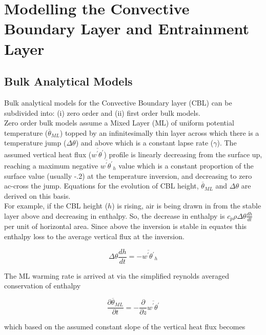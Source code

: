 \section{Modelling the Convective Boundary Layer and Entrainment Layer}
\label{sec:}

\subsection{Bulk Analytical Models}
\label{subsec:}
Bulk analytical models for the Convective Boundary layer (\acs{CBL}) can be subdivided into: (i) zero order
and (ii) first order bulk models.\\

Zero order bulk models assume a Mixed Layer (\acs{ML}) of uniform potential temperature ($\overline{\theta}_{ML}$) topped by an infinitesimally 
thin layer across which there is a temperature jump ($\Delta \theta$) and above which is a constant lapse rate ($\gamma$).  
The assumed vertical heat flux ($\overline{w^{'}\theta^{'}}$) profile is linearly decreasing from the surface up, reaching 
a maximum negative $\overline{w^{'}\theta^{'}}_{h}$ value which is a constant proportion of the surface value (usually -.2)
at the temperature inversion, and decreasing to zero ac-cross the jump.  Equations for the evolution of \acs{CBL} height,
 $\overline{\theta}_{ML}$ and $\Delta \theta$ are derived on this basis.\\

For example, if the \acs{CBL} height ($h$) is rising, air is being drawn in from the stable layer above and decreasing in enthalpy.
So, the decrease in enthalpy is $c_{p}\rho\Delta \theta \frac{dh}{dt}$ per unit of horizontal area.  Since above the 
inversion is stable \citeauthor{Tennekes73} in \cite{Tennekes73} equates this enthalpy loss to the average vertical flux at the inversion.

\begin{equation}
\Delta \theta \frac{dh}{dt} = -\overline{w^{'}\theta^{'}}_{h} 
\end{equation}  

The \acs{ML} warming rate is arrived at via the simplified reynolds averaged conservation of enthalpy

\begin{equation}
\frac{\partial \overline{\theta}_{ML}}{\partial t} = -\frac{\partial}{\partial z}\overline{w^{'}\theta^{'}}
\end{equation}

which based on the assumed constant slope of the vertical heat flux becomes

